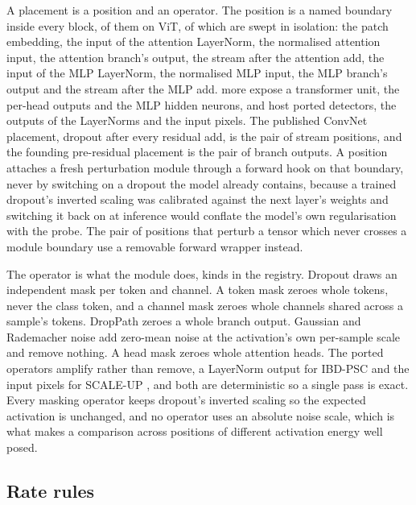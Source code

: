 \documentclass[../main.tex]{subfiles}
\begin{document}
A placement is a position and an operator. The position is a named boundary inside every block, \PositionCount{} of them on ViT, of which \SinglePositionCount{} are swept in isolation: the patch embedding, the input of the attention LayerNorm, the normalised attention input, the attention branch's output, the stream after the attention add, the input of the MLP LayerNorm, the normalised MLP input, the MLP branch's output and the stream after the MLP add. \StructuredPositionCount{} more expose a transformer unit, the per-head outputs and the MLP hidden neurons, and \PortedPositionCount{} host ported detectors, the outputs of the LayerNorms and the input pixels. The published ConvNet placement, dropout after every residual add, is the pair of stream positions, and the founding pre-residual placement is the pair of branch outputs. A position attaches a fresh perturbation module through a forward hook on that boundary, never by switching on a dropout the model already contains, because a trained dropout's inverted scaling was calibrated against the next layer's weights and switching it back on at inference would conflate the model's own regularisation with the probe. The pair of positions that perturb a tensor which never crosses a module boundary use a removable forward wrapper instead.

The operator is what the module does, \OperatorCount{} kinds in the registry. Dropout draws an independent mask per token and channel. A token mask zeroes whole tokens, never the class token, and a channel mask zeroes whole channels shared across a sample's tokens. DropPath zeroes a whole branch output. Gaussian and Rademacher noise add zero-mean noise at the activation's own per-sample scale and remove nothing. A head mask zeroes whole attention heads. The ported operators amplify rather than remove, a LayerNorm output for IBD-PSC \citep{hou2024ibdpsc} and the input pixels for SCALE-UP \citep{guo2023scale}, and both are deterministic so a single pass is exact. Every masking operator keeps dropout's inverted scaling so the expected activation is unchanged, and no operator uses an absolute noise scale, which is what makes a comparison across positions of different activation energy well posed.

\subsection{Rate rules}
\end{document}
